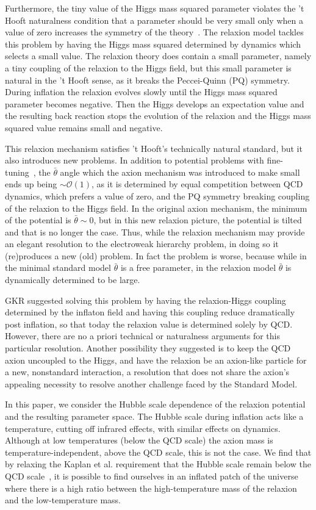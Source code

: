\documentclass[12pt,aps,prd,showpacs,notitlepage,nofootinbib]{revtex4-1}
\begin{document}
Furthermore, the tiny value of the Higgs mass squared parameter violates the 't Hooft naturalness condition that a parameter should be very small only when a value of zero increases the symmetry of the theory~\cite{tHooft:1979rat}. The relaxion model tackles this problem by having the Higgs mass squared determined by dynamics which selects a small value. The relaxion theory does contain a small parameter, namely a tiny coupling of the relaxion to the Higgs field, but this small parameter is natural in the 't Hooft sense, as it breaks the Peccei-Quinn (PQ) symmetry.  During inflation the relaxion evolves slowly until the  Higgs mass squared parameter becomes negative. Then the Higgs develops an expectation value and the resulting back reaction stops the evolution of the relaxion and the Higgs mass squared value remains small and negative.

This relaxion mechanism satisfies 't Hooft's technically natural standard, but it also introduces new problems. In addition to potential problems with fine-tuning~\cite{DiChiara:2015euo,Fowlie:2016jlx}, the $\bar{\theta}$  angle which the axion mechanism was introduced to make small ends up being $\sim \mathcal{O}(1)$, as it is determined by equal competition between QCD dynamics, which prefers a value of zero, and  the PQ symmetry breaking coupling of the relaxion to the Higgs field. In the original axion mechanism, the minimum of the potential is $\bar{\theta} \sim 0$, but in this new relaxion picture, the potential is tilted and that is no longer the case. Thus, while the relaxion mechanism may provide an elegant resolution to the electroweak hierarchy problem, in doing so it (re)produces a new (old) problem. In fact the problem is worse, because while in the minimal standard model $\bar\theta$ is a free parameter, in the relaxion model $\bar\theta$ is dynamically determined to be large. 

GKR suggested solving this problem by having the relaxion-Higgs coupling determined by the inflaton field and having this coupling reduce dramatically post inflation, so that today the relaxion value is determined solely by QCD. However, there are no a priori technical or naturalness arguments for this particular resolution. Another possibility they suggested is to keep the QCD axion uncoupled to the Higgs, and have the relaxion be an axion-like particle for a new, nonstandard interaction, a resolution that does not share the axion's appealing necessity to resolve another challenge faced by the Standard Model.
	
In this paper, we consider the Hubble scale dependence of the relaxion potential and the resulting parameter space. The Hubble scale during inflation acts like a temperature, cutting off infrared effects, with similar effects on dynamics. Although at low temperatures (below the QCD scale) the axion mass is temperature-independent, above the QCD scale, this is not the case. We find that by relaxing the Kaplan et al. requirement that the Hubble scale remain below the QCD scale~\cite{Kobayashi:2016bue,2015JHEP...12..162B}, it is possible to find ourselves in an inflated patch of the universe where there is a high ratio between the high-temperature mass of the relaxion and the low-temperature mass. 
\end{document}
